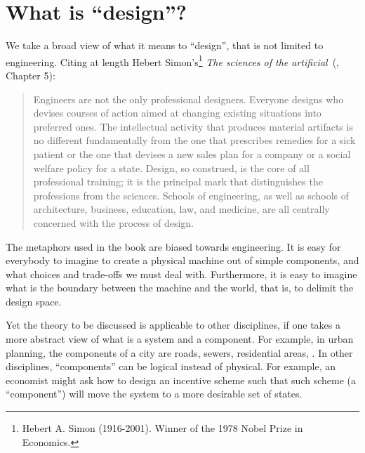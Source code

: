 
\section{What is ``design''?}
\label{sec:design-what-is-design}


We take a broad view of what it means to ``design'', that is not limited to engineering.
Citing at length Hebert Simon's\footnote{Hebert A.
	Simon (1916-2001).
	Winner of the 1978 Nobel Prize in Economics.
}
\emph{The sciences of the artificial}~(\cite{hebert96sciences}, Chapter 5):

\begin{quote}
	Engineers are not the only professional designers.
	Everyone designs who devises courses of action aimed at changing existing situations into preferred ones.
	The intellectual activity that produces material artifacts is no different fundamentally from the one that prescribes remedies for a sick patient or the one that devises a new sales plan for a company or a social welfare policy for a state.
	Design, so construed, is the core of all professional training;
	it is the principal mark that distinguishes the professions from the sciences.
	Schools of engineering, as well as schools of architecture, business, education, law, and medicine, are all centrally concerned with the process of design.
\end{quote}

The metaphors used in the book are biased towards engineering.
It is easy for everybody to imagine to create a physical machine out of simple components, and what choices and trade-offs we must deal with.
Furthermore, it is easy to imagine what is the boundary between the machine and the world, that is, to delimit the design space.

Yet the theory to be discussed is applicable to other disciplines, if one takes a more abstract view of what is a system and a component.
For example, in urban planning, the components of a city are roads, sewers, residential areas, \etc.
In other disciplines, ``components'' can be logical instead of physical.
For example, an economist might ask how to design an incentive scheme such that such scheme (a ``component'') will move the system to a more desirable set of states.
